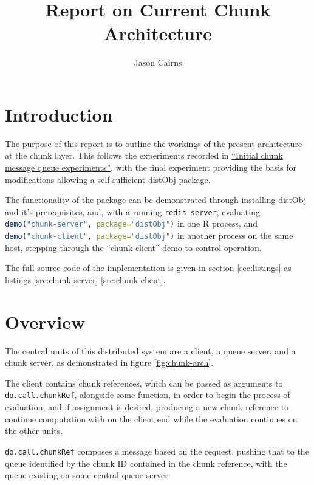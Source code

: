 \documentclass[a4paper,10pt]{article}
\begin{document}
\title{Report on Current Chunk Architecture}
\author{Jason Cairns}
  
\maketitle

\section{Introduction}

The purpose of this report is to outline the workings of the present
architecture at the chunk layer.
This follows the experiments recorded in
\href{init-chunk-msg-q-exp.pdf}{``Initial chunk message queue experiments''},
with the final experiment providing the basis for modifications allowing a
self-sufficient distObj package.

The functionality of the package can be demonstrated through installing distObj
and it's prerequisites, and, with a running \texttt{redis-server}, evaluating
\lstinline[language=R]{demo("chunk-server", package="distObj")} in one R
process, and \lstinline[language=R]{demo("chunk-client", package="distObj")} in
another process on the same host, stepping through the ``chunk-client'' demo to
control operation.



The full source code of the implementation is given in section
\ref{sec:listings} as listings \ref{src:chunk-server}-\ref{src:chunk-client}.

\section{Overview}

The central units of this distributed system are a client, a queue server, and
a chunk server, as demonstrated in figure \ref{fig:chunk-arch}.

The client contains chunk references, which can be passed as arguments to
\texttt{do.call.chunkRef}, alongside some function, in order to begin the
process of evaluation, and if assignment is desired, producing a new chunk
reference to continue computation with on the client end while the evaluation
continues on the other units.

\texttt{do.call.chunkRef} composes a message based on the request, pushing that
to the queue identified by the chunk ID contained in the chunk reference, with
the queue existing on some central queue server.
\end{document}
